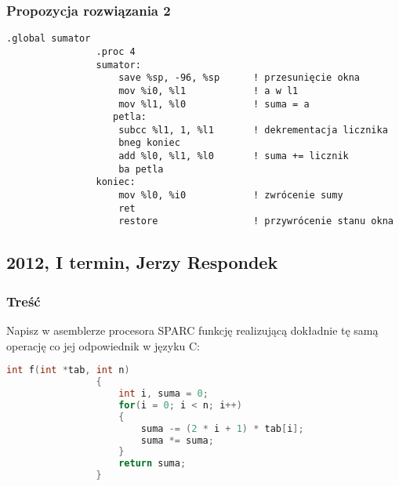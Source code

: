 		\subsubsection{Propozycja rozwiązania 2}
			\begin{lstlisting}[language={[sparc]Assembler}]
			    .global sumator
			    .proc 4
			    sumator:
				    save %sp, -96, %sp		! przesunięcie okna
				    mov %i0, %l1			! a w l1
				    mov %l1, %l0			! suma = a
				   petla:
				    subcc %l1, 1, %l1		! dekrementacja licznika
				    bneg koniec
				    add %l0, %l1, %l0		! suma += licznik
				    ba petla
			    koniec:
				    mov %l0, %i0			! zwrócenie sumy
				    ret
				    restore					! przywrócenie stanu okna
			\end{lstlisting}
			
	\newpage
	\subsection{2012, I termin, Jerzy Respondek}
		\subsubsection{Treść}
			Napisz w asemblerze procesora SPARC funkcję realizującą dokładnie tę samą operację co jej odpowiednik w języku C:
			\begin{lstlisting}[language=C]
				int f(int *tab, int n)
				{
					int i, suma = 0;
					for(i = 0; i < n; i++)
					{
						suma -= (2 * i + 1) * tab[i];
						suma *= suma;
					}
					return suma;
				}
			\end{lstlisting}
